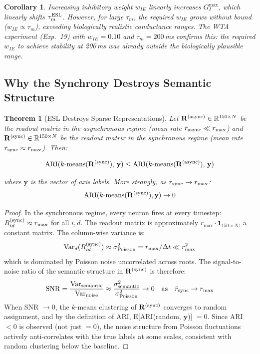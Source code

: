 \documentclass{article}
\newtheorem{theorem}{Theorem}
\newtheorem{corollary}{Corollary}
\begin{document}
\begin{corollary}
\label{cor:esl}
Increasing inhibitory weight $w_{IE}$ linearly increases $G_I^{\max}$, which linearly shifts $\tau_m^{\rm ESL}$. However, for large $\tau_m$, the required $w_{IE}$ grows without bound ($w_{IE} \propto \tau_m$), exceeding biologically realistic conductance ranges. The WTA experiment (Exp.~19) with $w_{IE} = 0.10$ and $\tau_m = 200$\,ms confirms this: the required $w_{IE}$ to achieve stability at 200\,ms was already outside the biologically plausible range.
\end{corollary}

\subsection{Why the Synchrony Destroys Semantic Structure}

\begin{theorem}[ESL Destroys Sparse Representations]
\label{thm:void}
Let $\mathbf{R}^{(\rm async)} \in \mathbb{R}^{150 \times N}$ be the readout matrix in the asynchronous regime (mean rate $\bar{r}_{\rm async} \ll r_{\max}$) and $\mathbf{R}^{(\rm sync)} \in \mathbb{R}^{150 \times N}$ be the readout matrix in the synchronous regime (mean rate $\bar{r}_{\rm sync} \approx r_{\max}$). Then:

\begin{equation}
\mathrm{ARI}(k\text{-means}(\mathbf{R}^{(\rm sync)}),\, \mathbf{y}) \leq \mathrm{ARI}(k\text{-means}(\mathbf{R}^{(\rm async)}),\, \mathbf{y})
\label{eq:ari_ineq}
\end{equation}

where $\mathbf{y}$ is the vector of axis labels. More strongly, as $\bar{r}_{\rm sync} \to r_{\max}$:
\begin{equation}
\mathrm{ARI}(k\text{-means}(\mathbf{R}^{(\rm sync)}), \mathbf{y}) \to 0
\label{eq:ari_zero}
\end{equation}
\end{theorem}

\begin{proof}
In the synchronous regime, every neuron fires at every timestep: $R_{id}^{(\rm sync)} \approx r_{\max}$ for all $i, d$. The readout matrix is approximately $r_{\max} \cdot \mathbf{1}_{150 \times N}$, a constant matrix. The column-wise variance is:
\[
\mathrm{Var}_d(R_{id}^{(\rm sync)}) \approx \sigma_{\rm Poisson}^2 = r_{\max}/\Delta t \ll r_{\max}^2
\]
which is dominated by Poisson noise uncorrelated across roots. The signal-to-noise ratio of the semantic structure in $\mathbf{R}^{(\rm sync)}$ is therefore:
\[
\mathrm{SNR} = \frac{\mathrm{Var}_{\rm semantic}}{\mathrm{Var}_{\rm noise}} \approx \frac{\sigma_{\rm semantic}^2}{\sigma_{\rm Poisson}^2} \to 0 \quad \text{as}\quad \bar{r}_{\rm sync} \to r_{\max}
\]
When SNR $\to 0$, the $k$-means clustering of $\mathbf{R}^{(\rm sync)}$ converges to random assignment, and by the definition of ARI, E[ARI(random, $\mathbf{y}$)] $= 0$. Since ARI $< 0$ is observed (not just $= 0$), the noise structure from Poisson fluctuations actively anti-correlates with the true labels at some scales, consistent with random clustering below the baseline.
\end{proof}
\end{document}
